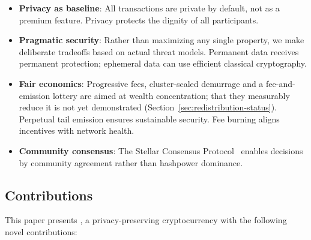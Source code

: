 \begin{itemize}
  \item \textbf{Privacy as baseline}: All transactions are private by
    default, not as a premium feature. Privacy protects the dignity of
    all participants.

  \item \textbf{Pragmatic security}: Rather than maximizing any single
    property, we make deliberate tradeoffs based on actual threat models.
    Permanent data receives permanent protection; ephemeral data can use
    efficient classical cryptography.

  \item \textbf{Fair economics}: Progressive fees, cluster-scaled
    demurrage and a fee-and-emission lottery are aimed at wealth
    concentration; that they measurably reduce it is not yet demonstrated
    (Section~\ref{sec:redistribution-status}). Perpetual tail emission
    ensures sustainable security.
    Fee burning aligns incentives with network health.

  \item \textbf{Community consensus}: The Stellar Consensus Protocol~\cite{scp}
    enables decisions by community agreement rather than hashpower
    dominance.
\end{itemize}

\subsection{Contributions}

This paper presents \Botho, a privacy-preserving cryptocurrency with the
following novel contributions:

